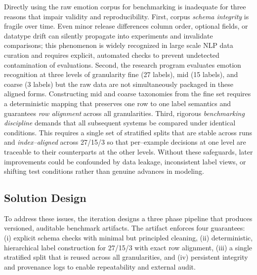 Directly using the raw emotion corpus for benchmarking is inadequate for three reasons that impair validity and reproducibility. First, corpus \emph{schema integrity} is fragile over time. Even minor release differences column order, optional fields, or datatype drift can silently propagate into experiments and invalidate comparisons; this phenomenon is widely recognized in large scale NLP data curation and requires explicit, automated checks to prevent undetected contamination of evaluations. Second, the research program evaluates emotion recognition at three levels of granularity fine (27 labels), mid (15 labels), and coarse (3 labels) but the raw data are not simultaneously packaged in these aligned forms. Constructing mid and coarse taxonomies from the fine set requires a deterministic mapping that preserves one row to one label semantics and guarantees \emph{row alignment} across all granularities. Third, rigorous \emph{benchmarking discipline} demands that all subsequent systems be compared under identical conditions. This requires a single set of stratified splits that are stable across runs and \emph{index--aligned} across 27/15/3 so that per--example decisions at one level are traceable to their counterparts at the other levels. Without these safeguards, later improvements could be confounded by data leakage, inconsistent label views, or shifting test conditions rather than genuine advances in modeling.

\subsection{Solution Design}

To address these issues, the iteration designs a three phase pipeline that produces versioned, auditable benchmark artifacts. The artifact enforces four guarantees: (i) explicit schema checks with minimal but principled cleaning, (ii) deterministic, hierarchical label construction for 27/15/3 with exact row alignment, (iii) a single stratified split that is reused across all granularities, and (iv) persistent integrity and provenance logs to enable repeatability and external audit.

